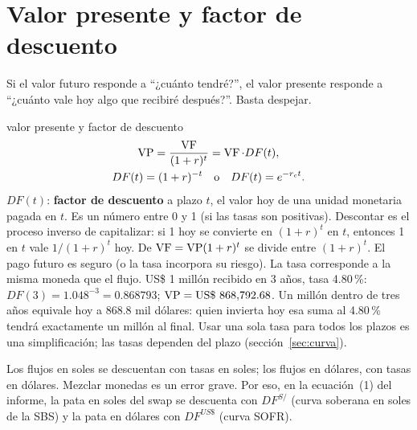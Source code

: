 \section{Valor presente y factor de descuento}

Si el valor futuro responde a \enquote{¿cuánto tendré?}, el valor presente responde a \enquote{¿cuánto vale hoy algo que recibiré después?}. Basta despejar.

\begin{ficha}{valor presente y factor de descuento}
\begin{gather*} \operatorname{VP}=\frac{\operatorname{VF}}{(1+r)^t}=\operatorname{VF}\cdot DF(t),\\ DF(t)=(1+r)^{-t}\quad\text{o}\quad DF(t)=e^{-r_c t}. \end{gather*}
 $DF(t)$: \textbf{factor de descuento} a plazo $t$, el valor hoy de una unidad monetaria pagada en $t$. Es un número entre 0 y 1 (si las tasas son positivas).
 Descontar es el proceso inverso de capitalizar: si 1 hoy se convierte en $(1+r)^t$ en $t$, entonces 1 en $t$ vale $1/(1+r)^t$ hoy.
 De $\operatorname{VF}=\operatorname{VP}(1+r)^t$ se divide entre $(1+r)^t$.
 El pago futuro es seguro (o la tasa incorpora su riesgo). La tasa corresponde a la misma moneda que el flujo.
 US\$ 1 millón recibido en 3 años, tasa 4.80\,\%: $DF(3)=1.048^{-3}=0.868793$; $\operatorname{VP}=\text{US\$}~868{,}792.68$.
 Un millón dentro de tres años equivale hoy a 868.8 mil dólares: quien invierta hoy esa suma al 4.80\,\% tendrá exactamente un millón al final.
 Usar una sola tasa para todos los plazos es una simplificación; las tasas dependen del plazo (sección~\ref{sec:curva}).
\end{ficha}


\begin{importante}
Los flujos en soles se descuentan con tasas en soles; los flujos en dólares, con tasas en dólares. Mezclar monedas es un error grave. Por eso, en la ecuación~(1) del informe, la pata en soles del swap se descuenta con $DF^{S/}$ (curva soberana en soles de la SBS) y la pata en dólares con $DF^{US\$}$ (curva SOFR).
\end{importante}

